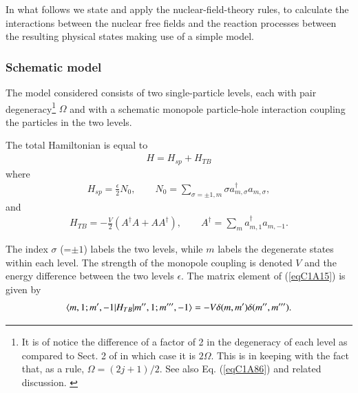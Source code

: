 In what follows we state and apply the nuclear-field-theory rules, to calculate the interactions between the nuclear free fields and the reaction processes
between the resulting physical states making use of a simple model. \subsubsection{Schematic model}
The model considered consists of two single-particle levels, each with pair degeneracy\footnote{It is of notice the difference of a factor of 2 in the degeneracy of each level as compared to Sect. 2 of \cite{Bortignon:77} in which case it is $2\Omega$. This is in keeping with the fact that, as a rule, $\Omega=(2j+1)/2$. See also Eq. (\ref{eqC1A86}) and related discussion. \label{fnlabel}} $\Omega$ and with a schematic monopole particle-hole interaction coupling the particles in the two levels.

The total Hamiltonian is equal to
\begin{align}\label{eqC1A13} 
H=H_{sp}+H_{TB}
\end{align}
where
\begin{align}\label{eqC1A14} 
H_{sp}=\frac{\epsilon}{2}N_0,\quad\quad N_0=\sum_{\sigma=\pm 1,m}\sigma a^{\dagger}_{m,\sigma}a_{m,\sigma},
\end{align}
and
\begin{align}\label{eqC1A15} 
H_{TB}=-\frac{V}{2}\left(A^\dagger A+AA^\dagger\right),\quad\quad A^\dagger=\sum_m a^\dagger_{m,1}a_{m,-1}.
\end{align}


The index $\sigma$ (=$\pm1$) labels the two levels, while $m$ labels the degenerate states within
each level. The strength of the monopole coupling is denoted  $V$ and the
energy difference between the two levels  $\epsilon$. 
The matrix element of (\ref{eqC1A15}) is given by
\begin{align}\label{eqC1A16} 
\langle {m,1;m',-1|H_{TB}|m'',1;m''',-1} \rangle=-V\delta(m,m')\delta(m'',m''').
\end{align}
